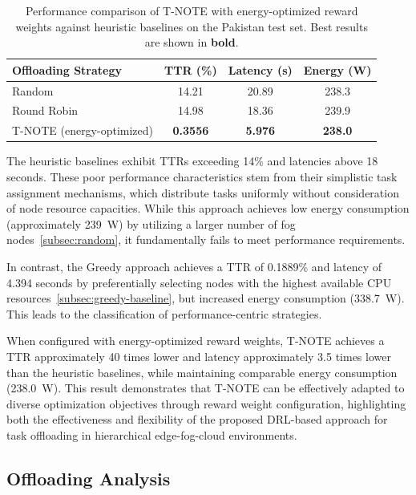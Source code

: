 \documentclass{svproc}
\begin{document}
\begin{table}[htbp]
\centering
\begin{tabular}{lccc}
\toprule
\textbf{Offloading Strategy} & \textbf{TTR (\%)} & \textbf{Latency (s)} & \textbf{Energy (W)} \\
\midrule
Random 
 & 14.21
 & 20.89
 & 238.3 \\
Round Robin 
 & 14.98
 & 18.36
 & 239.9 \\
\midrule
T-NOTE (energy-optimized)
 & \textbf{0.3556} 
 & \textbf{5.976} 
 & \textbf{238.0} \\
\bottomrule
\end{tabular}
\caption{Performance comparison of T-NOTE with energy-optimized reward weights against heuristic baselines on the Pakistan test set. Best results are shown in \textbf{bold}.}
\label{tab:energy_comparison}
\end{table}

The heuristic baselines exhibit TTRs exceeding 14\% and latencies above 18 seconds. These poor performance characteristics stem from their simplistic task assignment mechanisms, which distribute tasks uniformly without consideration of node resource capacities. While this approach achieves low energy consumption (approximately 239~W) by utilizing a larger number of fog nodes~\ref{subsec:random}, it fundamentally fails to meet performance requirements.

In contrast, the Greedy approach achieves a TTR of 0.1889\% and latency of 4.394 seconds by preferentially selecting nodes with the highest available CPU resources~\ref{subsec:greedy-baseline}, but increased energy consumption (338.7~W). This leads to the classification of performance-centric strategies.

When configured with energy-optimized reward weights, T-NOTE achieves a TTR approximately 40 times lower and latency approximately 3.5 times lower than the heuristic baselines, while maintaining comparable energy consumption (238.0~W). This result demonstrates that T-NOTE can be effectively adapted to diverse optimization objectives through reward weight configuration, highlighting both the effectiveness and flexibility of the proposed DRL-based approach for task offloading in hierarchical edge-fog-cloud environments.

\subsection{Offloading Analysis}\label{subsec:offloading-analysis}
\end{document}
